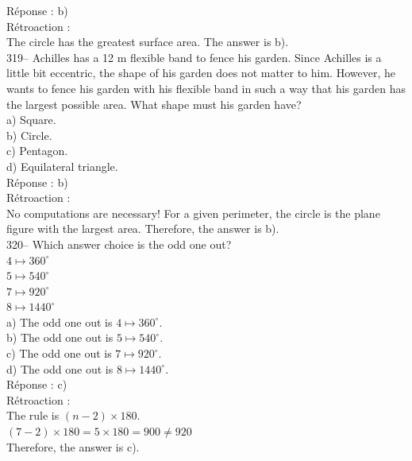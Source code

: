 \documentclass[letterpaper, 12pt]{article}
\begin{document}
R\'eponse : b)\\

R\'etroaction :\\
The circle has the greatest surface area. The answer is b).\\

319-- Achilles has a 12 m flexible band to fence his garden. Since Achilles is a little bit eccentric, the shape of his garden does not matter to him. However, he wants to fence his garden with his flexible band in such a way that his garden has the largest possible area. What shape must his garden have?\\

a) Square.\\
b) Circle.\\
c) Pentagon.\\
d) Equilateral triangle.\\

R\'eponse : b)\\

R\'etroaction : \\
No computations are necessary! For a given perimeter, the circle is the plane figure with the largest area. Therefore, the answer is b).\\


320-- Which answer choice is the odd one out?\\

$4\longmapsto 360^{\circ}$\\
$5\longmapsto 540^{\circ}$\\
$7\longmapsto 920^{\circ}$\\
$8\longmapsto 1440^{\circ}$\\

a) The odd one out is $4\longmapsto 360^{\circ}$.\\
b) The odd one out is $5\longmapsto 540^{\circ}$.\\
c) The odd one out is $7\longmapsto 920^{\circ}$.\\
d) The odd one out is $8\longmapsto 1440^{\circ}$.\\

R\'eponse : c)\\

R\'etroaction : \\
The rule is $\left(n-2\right) \times 180$.\\
$\left( 7-2 \right) \times 180 = 5\times180=900\neq920$\\
Therefore, the answer is c).\\
\end{document}
